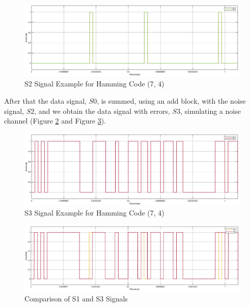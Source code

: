 \begin{refsection}
\begin{figure}[h!]
	\centering
	\includegraphics[width=.9\linewidth]{./sdf/eit_25828_hamming_channel_encoder_decoder/images/S2.png}
	\vspace{-3mm}
	\caption{S2 Signal Example for Hamming Code (7, 4)}
	\label{fig:hammingEncoderDecoder_S2}
\end{figure}

\vspace{60mm}

After that the data signal, $S0$, is summed, using an add block, with the noise signal, $S2$, and we obtain the data signal with errors, $S3$, simulating a noise channel (Figure \ref{fig:hammingEncoderDecoder_S3} and Figure \ref{fig:hammingEncoderDecoder_S1_S3}).

\begin{figure}[h!]
	\centering
	\includegraphics[width=.9\linewidth]{./sdf/eit_25828_hamming_channel_encoder_decoder/images/S3.png}
	\vspace{-3mm}
	\caption{S3 Signal Example for Hamming Code (7, 4)}
	\label{fig:hammingEncoderDecoder_S3}
\end{figure}

\begin{figure}[h!]
	\centering
	\includegraphics[width=.9\linewidth]{./sdf/eit_25828_hamming_channel_encoder_decoder/images/S1_S3.png}
	\vspace{-3mm}
	\caption{Comparison of S1 and S3 Signals}
	\label{fig:hammingEncoderDecoder_S1_S3}
\end{figure}


\end{refsection}
